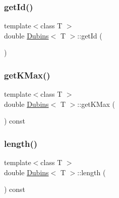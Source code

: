 \mbox{\label{class_dubins_a5781212ce32e684018104d2c0676ceb6}} 
\subsubsection{\texorpdfstring{getId()}{getId()}}
{\footnotesize\ttfamily template$<$class T $>$ \\
double \mbox{\hyperlink{class_dubins}{Dubins}}$<$ T $>$\+::get\+Id (\begin{DoxyParamCaption}{ }\end{DoxyParamCaption})\hspace{0.3cm}{\ttfamily [inline]}}

\mbox{\label{class_dubins_a5e9a9f09ceed8f592fd35d078090854e}} 
\subsubsection{\texorpdfstring{getKMax()}{getKMax()}}
{\footnotesize\ttfamily template$<$class T $>$ \\
double \mbox{\hyperlink{class_dubins}{Dubins}}$<$ T $>$\+::get\+K\+Max (\begin{DoxyParamCaption}{ }\end{DoxyParamCaption}) const\hspace{0.3cm}{\ttfamily [inline]}}

\mbox{\label{class_dubins_ae4978fe0667d364224c0a7521903a225}} 
\subsubsection{\texorpdfstring{length()}{length()}}
{\footnotesize\ttfamily template$<$class T $>$ \\
double \mbox{\hyperlink{class_dubins}{Dubins}}$<$ T $>$\+::length (\begin{DoxyParamCaption}{ }\end{DoxyParamCaption}) const\hspace{0.3cm}{\ttfamily [inline]}}

\mbox{\label{class_dubins_ac07e1eb3ab336641a275c28423658155}} 

